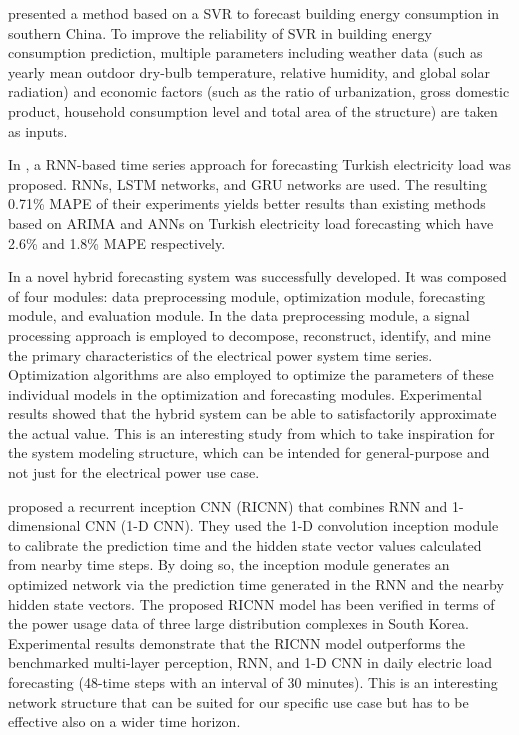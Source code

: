 \cite{MA20193433} presented a method based on a SVR to forecast building energy consumption in southern China.
To improve the reliability of SVR in building energy consumption prediction, multiple parameters including weather data (such as yearly mean outdoor dry-bulb temperature, relative humidity, and global solar radiation) and economic factors (such as the ratio of urbanization, gross domestic product, household consumption level and total area of the structure) are taken as inputs.

In \cite{8404313}, a RNN-based time series approach for forecasting Turkish electricity load was proposed.
RNNs, LSTM networks, and GRU networks are used.
The resulting 0.71\% MAPE of their experiments yields better results than existing methods based on ARIMA and ANNs on Turkish electricity load forecasting which have 2.6\% and 1.8\% MAPE respectively.

In \cite{DU2018533} a novel hybrid forecasting system was successfully developed.
It was composed of four modules: data preprocessing module, optimization module, forecasting module, and evaluation module.
In the data preprocessing module, a signal processing approach is employed to decompose, reconstruct, identify, and mine the primary characteristics of the electrical power system time series.
Optimization algorithms are also employed to optimize the parameters of these individual models in the optimization and forecasting modules.
Experimental results showed that the hybrid system can be able to satisfactorily approximate the actual value.
This is an interesting study from which to take inspiration for the system modeling structure, which can be intended for general-purpose and not just for the electrical power use case.

\cite{KIM2019328} proposed a recurrent inception CNN (RICNN) that combines RNN and 1-dimensional CNN (1-D CNN).
They used the 1-D convolution inception module to calibrate the prediction time and the hidden state vector values calculated from nearby time steps.
By doing so, the inception module generates an optimized network via the prediction time generated in the RNN and the nearby hidden state vectors.
The proposed RICNN model has been verified in terms of the power usage data of three large distribution complexes in South Korea.
Experimental results demonstrate that the RICNN model outperforms the benchmarked multi-layer perception, RNN, and 1-D CNN in daily electric load forecasting (48-time steps with an interval of 30 minutes).
This is an interesting network structure that can be suited for our specific use case but has to be effective also on a wider time horizon.

